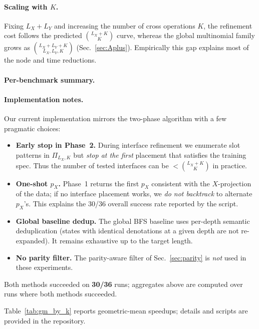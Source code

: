 \documentclass[11pt]{article}
\begin{document}
\paragraph{Scaling with \(K\).}
Fixing \(L_X{+}L_Y\) and increasing the number of cross operations \(K\), the refinement cost follows the predicted \(\binom{L_X+K}{K}\) curve, whereas the global multinomial family grows as \(\binom{L_X+L_Y+K}{L_X,L_Y,K}\) (Sec.~\ref{sec:Aplus}). Empirically this gap explains most of the node and time reductions.

\paragraph{Per-benchmark summary.}

\paragraph{Implementation notes.}
Our current implementation mirrors the two-phase algorithm with a few pragmatic choices:
\begin{itemize}
\item \textbf{Early stop in Phase~2.} During interface refinement we enumerate slot patterns in $\Pi_{L_X,K}$ but \emph{stop at the first} placement that satisfies the training spec. Thus the number of tested interfaces can be $<\binom{L_X+K}{K}$ in practice.
\item \textbf{One-shot $p_X$.} Phase~1 returns the first $p_X$ consistent with the $X$-projection of the data; if no interface placement works, we \emph{do not backtrack} to alternate $p_X$'s. This explains the 30/36 overall success rate reported by the script.
\item \textbf{Global baseline dedup.} The global BFS baseline uses per-depth semantic deduplication (states with identical denotations at a given depth are not re-expanded). It remains exhaustive up to the target length.
\item \textbf{No parity filter.} The parity-aware filter of Sec.~\ref{sec:parity} is \emph{not} used in these experiments.
\end{itemize}

Both methods succeeded on \textbf{30/36} runs; aggregates above are computed over runs where both methods succeeded.

Table~\ref{tab:gm_by_k} reports geometric-mean speedups; details and scripts are provided in the repository.
\end{document}
